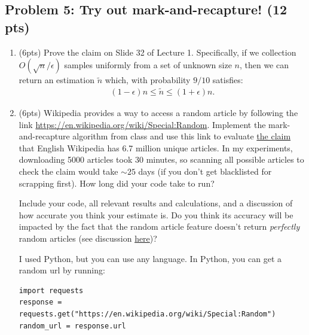 \documentclass[10pt]{article}
\begin{document}
\subsection{Problem 5: Try out mark-and-recapture! (12 pts)}
\begin{enumerate}
	\item (6pts) Prove the claim on Slide 32 of Lecture 1. Specifically, if we collection $O(\sqrt{n}/\epsilon)$ samples uniformly from a set of unknown size $n$, then we can return an estimation $\tilde{n}$ which, with probability $9/10$ satisfies:
	\begin{align*}
		(1-\epsilon)n \leq \tilde{n} \leq (1+\epsilon)n.
	\end{align*}
	
	\item (6pts) Wikipedia provides a way to access a random article by following the link \url{https://en.wikipedia.org/wiki/Special:Random}. Implement the mark-and-recapture algorithm from class and use this link to evaluate \href{https://en.wikipedia.org/wiki/English_Wikipedia}{the claim} that English Wikipedia has 6.7 million unique articles. In my experiments, downloading 5000 articles took 30 minutes, so scanning all possible articles to check the claim would take $\sim 25$ days (if you don't get blacklisted for scrapping first). How long did your code take to run?
	
	Include your code, all relevant results and calculations, and a discussion of how accurate you think your estimate is. Do you think its accuracy will be impacted by the fact that the random article feature doesn't return \emph{perfectly} random articles (see discussion \href{https://en.wikipedia.org/wiki/Wikipedia:FAQ/Technical#random}{here})?
	
	 I  used Python, but you can use any language. In Python, you can get a random url by running:
\begin{verbatim}
import requests
response = requests.get("https://en.wikipedia.org/wiki/Special:Random")
random_url = response.url	
\end{verbatim}

\end{enumerate}
\end{document}
